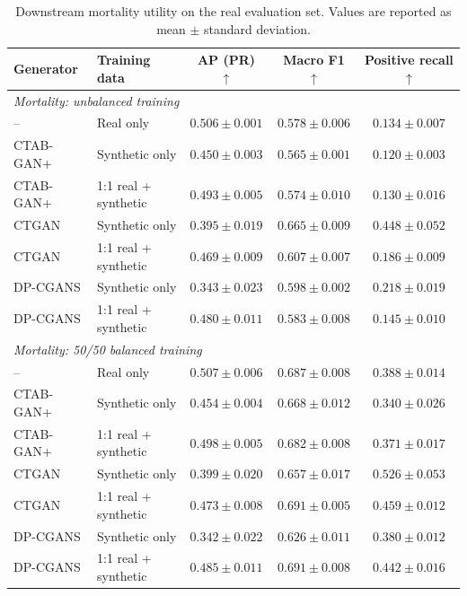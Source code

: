\begin{table}[htbp]
    \centering
    \caption{Downstream mortality utility on the real evaluation set. Values
    are reported as mean $\pm$ standard deviation.}
    \label{tab:rq1_downstream_utility}
    \small
    \setlength{\tabcolsep}{5pt}
    \begin{tabular}{llccc}
        \toprule
        Generator & Training data & AP (PR) $\uparrow$ & Macro F1 $\uparrow$
            & Positive recall $\uparrow$ \\
        \midrule
        \multicolumn{5}{l}{\textit{Mortality: unbalanced training}} \\
        -- & Real only
            & $0.506 \pm 0.001$ & $0.578 \pm 0.006$ & $0.134 \pm 0.007$ \\
        CTAB-GAN+ & Synthetic only
            & $\mathbf{0.450 \pm 0.003}$ & $0.565 \pm 0.001$ & $0.120 \pm 0.003$ \\
        CTAB-GAN+ & 1:1 real + synthetic
            & $\mathbf{0.493 \pm 0.005}$ & $0.574 \pm 0.010$ & $0.130 \pm 0.016$ \\
        CTGAN & Synthetic only
            & $0.395 \pm 0.019$ & $\mathbf{0.665 \pm 0.009}$ & $\mathbf{0.448 \pm 0.052}$ \\
        CTGAN & 1:1 real + synthetic
            & $0.469 \pm 0.009$ & $\mathbf{0.607 \pm 0.007}$ & $\mathbf{0.186 \pm 0.009}$ \\
        DP-CGANS & Synthetic only
            & $0.343 \pm 0.023$ & $0.598 \pm 0.002$ & $0.218 \pm 0.019$ \\
        DP-CGANS & 1:1 real + synthetic
            & $0.480 \pm 0.011$ & $0.583 \pm 0.008$ & $0.145 \pm 0.010$ \\
        \midrule
        \multicolumn{5}{l}{\textit{Mortality: 50/50 balanced training}} \\
        -- & Real only
            & $0.507 \pm 0.006$ & $0.687 \pm 0.008$ & $0.388 \pm 0.014$ \\
        CTAB-GAN+ & Synthetic only
            & $\mathbf{0.454 \pm 0.004}$ & $\mathbf{0.668 \pm 0.012}$ & $0.340 \pm 0.026$ \\
        CTAB-GAN+ & 1:1 real + synthetic
            & $\mathbf{0.498 \pm 0.005}$ & $0.682 \pm 0.008$ & $0.371 \pm 0.017$ \\
        CTGAN & Synthetic only
            & $0.399 \pm 0.020$ & $0.657 \pm 0.017$ & $\mathbf{0.526 \pm 0.053}$ \\
        CTGAN & 1:1 real + synthetic
            & $0.473 \pm 0.008$ & $0.691 \pm 0.005$ & $\mathbf{0.459 \pm 0.012}$ \\
        DP-CGANS & Synthetic only
            & $0.342 \pm 0.022$ & $0.626 \pm 0.011$ & $0.380 \pm 0.012$ \\
        DP-CGANS & 1:1 real + synthetic
            & $0.485 \pm 0.011$ & $\mathbf{0.691 \pm 0.008}$ & $0.442 \pm 0.016$ \\
        \bottomrule
    \end{tabular}


\end{table}
